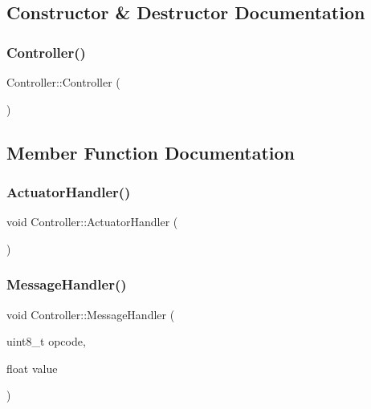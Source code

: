 \subsection{Constructor \& Destructor Documentation}
\mbox{\label{classController_a95c56822d667e94b031451729ce069a9}} 
\subsubsection{\texorpdfstring{Controller()}{Controller()}}
{\footnotesize\ttfamily Controller\+::\+Controller (\begin{DoxyParamCaption}{ }\end{DoxyParamCaption})\hspace{0.3cm}{\ttfamily [inline]}}



\subsection{Member Function Documentation}
\mbox{\label{classController_acd0145853d19eaf3ef9d15f6203ace69}} 
\subsubsection{\texorpdfstring{Actuator\+Handler()}{ActuatorHandler()}}
{\footnotesize\ttfamily void Controller\+::\+Actuator\+Handler (\begin{DoxyParamCaption}{ }\end{DoxyParamCaption})\hspace{0.3cm}{\ttfamily [private]}}

\mbox{\label{classController_affbf340fed1aca0172f336bcb2db8c8a}} 
\subsubsection{\texorpdfstring{Message\+Handler()}{MessageHandler()}}
{\footnotesize\ttfamily void Controller\+::\+Message\+Handler (\begin{DoxyParamCaption}\item[{uint8\+\_\+t}]{opcode,  }\item[{float}]{value }\end{DoxyParamCaption})}

